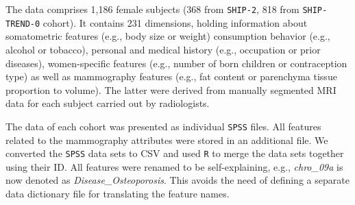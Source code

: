 \documentclass[journal]{style/vgtc} 			          %
\newcommand{\com}[1]{\textcolor{orange}{\uline{#1}}}
\begin{document}
The data comprises 1,186 female subjects (368 from \texttt{SHIP-2}, 818 from \texttt{SHIP-TREND-0} cohort).
It contains 231 dimensions, holding information about somatometric features (e.g., body size or weight) consumption behavior (e.g., alcohol or tobacco), personal and medical history (e.g., occupation or prior diseases), women-specific features (e.g., number of born children or contraception type) as well as mammography features (e.g., fat content or parenchyma tissue proportion to volume).
The latter were derived from manually segmented MRI data for each subject carried out by radiologists.

The data of each cohort was presented as individual \texttt{SPSS} files.
All features related to the mammography attributes were stored in an additional file.
We converted the \texttt{SPSS} data sets to CSV and used \texttt{R} to merge the data sets together using their ID.
All features were renamed to be self-explaining, e.g., \emph{chro\_09a} is now denoted as \emph{Disease\_Osteoporosis}.
This avoids the need of defining a separate data dictionary file for translating the feature names.
\end{document}
